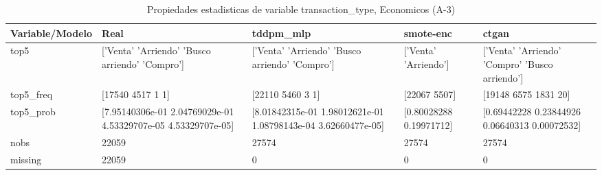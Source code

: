 \begin{table}[H]
\centering
\fontsize{8}{14}\selectfont
\caption{Propiedades  estadisticas de variable transaction\_type, Economicos (A-3)}
\label{table-stats-economicos-a-3-transaction_type}
\begin{tabular}{|l|m{10em}|m{10em}|m{10em}|m{10em}|}
\hline
 \rowcolor[gray]{0.8}
Variable/Modelo & Real & tddpm\_mlp & smote-enc & ctgan \\
\hline top5 & ['Venta' 'Arriendo' 'Busco arriendo' 'Compro'] & ['Venta' 'Arriendo' 'Busco arriendo' 'Compro'] & ['Venta' 'Arriendo'] & ['Venta' 'Arriendo' 'Compro' 'Busco arriendo'] \\
\hline top5\_freq & [17540  4517     1     1] & [22110  5460     3     1] & [22067  5507] & [19148  6575  1831    20] \\
\hline top5\_prob & [7.95140306e-01 2.04769029e-01 4.53329707e-05 4.53329707e-05] & [8.01842315e-01 1.98012621e-01 1.08798143e-04 3.62660477e-05] & [0.80028288 0.19971712] & [0.69442228 0.23844926 0.06640313 0.00072532] \\
\hline nobs & 22059 & 27574 & 27574 & 27574 \\
\hline missing & 22059 & 0 & 0 & 0 \\
\hline
\end{tabular}
\end{table}
